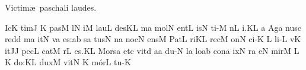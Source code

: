 
\beginhymn Victim\ae\ paschali laudes.

\nosolesmescustos
{}\Internote
{}
\initiumgregorianum
{}%
\sgn {}Ic\punctum K\egn
\sgn tim\punctum J\egn
\sgn {}{\ae}{}\punctum K\egn
\spatium
\sgn pas\punctum M\egn
{}l\punctum N\egn
\sgn {}i{}\punctum M\egn
\spatium
\sgn l{a}u\punctum L\egn
\sgn des\punctum K\augmentum L\egn
\spatium
\Asteriscus
\divisiominima
\spatium
\sgn {}{\'\i}m\punctum a\egn
\sgn mol\punctum N\egn
\sgn {}e{nt}\punctum L\egn
\spatium
{}is\punctum N\egn
\sgn ti-\punctum M\egn
{}n\punctum L\egn
\sgn {}i.\punctum K\augmentum L\egn
\spatium
\divisiofinalis
\spatium
\custos a
\lineaproxima
\sgn {}Ag\punctum a\egn
\sgn nus\punctum c\egn
\spatium
\sgn red\punctum d\egn
{}m\punctum a\egn
\sgn {}it\punctum N\egn
\spatium
{}v\punctum a\egn
\sgn {}e{s:}\punctum a\augmentum b\egn
\spatium
\divisiominor
\spatium
{}s\punctum a\egn
\sgn tus\punctum N\egn
\spatium
\sgn {}{\'\i}n\punctum a\egn
\sgn noc\punctum N\egn
\sgn {}e{ns}\punctum M\egn
\spatium
\sgn P{a}t\punctum L\egn
\sgn ri{}\punctum K\augmentum L\egn
\spatium
\divisiominima
\spatium
\sgn rec\punctum M\egn
\sgn {}on\punctum N\egn
\sgn ci-\punctum K\egn
\custos L
\lineaproxima
\sgn li-\punctum L\egn
{}v\punctum K\egn
\sgn {}it\punctum J\augmentum J\egn
\spatium
\sgn pec\engl{}\punctum L\egn
\sgn cat\punctum M\egn
{}r\punctum L\egn
\sgn {}e{s.}\punctum K\augmentum L\egn
\spatium
\divisiofinalis
\spatium
\sgn Mo{rs}\punctum a\egn
\spatium
\sgn {}et\punctum c\egn
\spatium
\sgn v{i}t\engl{}\punctum d\egn
\sgn {}a{}\punctum a\egn
\spatium
\sgn du-\punctum N\egn
{}l\punctum a\egn
\sgn lo{}\punctum a\augmentum b\egn
\spatium
\divisiominima
\spatium
\sgn con\punctum a\egn
{}ix\punctum N\egn
{}r\punctum a\egn
\sgn {}e{}\punctum N\egn
\spatium
\sgn mir\punctum M\egn
{}\punctum L\egn
{}\Internote
\custos K
\lineaproxima
\sgn do:\punctum K\augmentum L\egn
\spatium
\divisiominor
\spatium
\sgn dux\punctum M\egn
\spatium
\sgn v{i}t\punctum N\egn
\sgn {}{\ae}{}\punctum K\egn
\spatium
\sgn m{\'o}r\punctum L\egn
\sgn tu-\punctum K\egn

